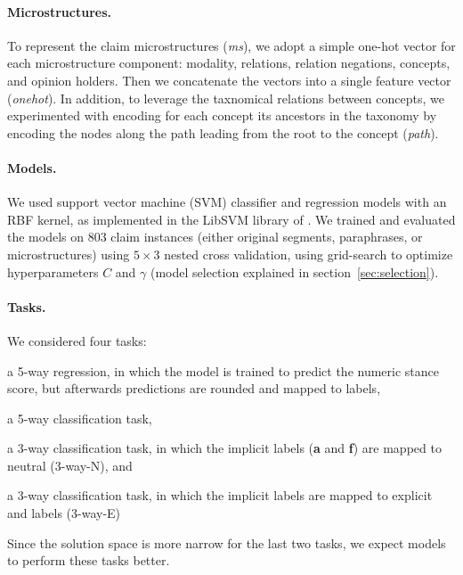 \paragraph{Microstructures.}
To represent the claim microstructures (\emph{ms}), we adopt a simple 
one-hot vector for each microstructure component: modality, relations, 
relation negations, concepts, and opinion holders.
Then we concatenate the vectors into a single feature vector (\emph{onehot}). 
In addition, to leverage the taxnomical relations between concepts, 
we experimented with encoding for each concept its ancestors in the taxonomy
by encoding the nodes along the path leading from the root to the concept (\emph{path}).

\paragraph{Models. }
We used support vector machine (SVM) classifier and regression models with an
RBF kernel, as implemented in the LibSVM library of \citet{chang2011libsvm}.
We trained and evaluated the models on 803 claim instances
(either original segments, paraphrases, or microstructures) using
$5 \times 3$ nested cross validation, using grid-search to 
optimize hyperparameters $C$ and $\gamma$
(model selection explained in section~\ref{sec:selection}).

\paragraph{Tasks.}
We considered four tasks:
\begin{enumerate*}[label=(\arabic*)]
\item a 5-way regression, in which the model is trained to predict the
numeric stance score, but afterwards predictions are rounded and mapped to labels,
\item a 5-way classification task,
\item a 3-way classification task, in which the implicit labels (\textbf{a} and \textbf{f}) are
mapped to neutral (3-way-N), and
\item a 3-way classification task, in which the implicit labels are mapped to
explicit  and  labels (3-way-E)
\end{enumerate*}
Since the solution space is more narrow for the last two tasks, 
we expect models to perform these tasks better. 


